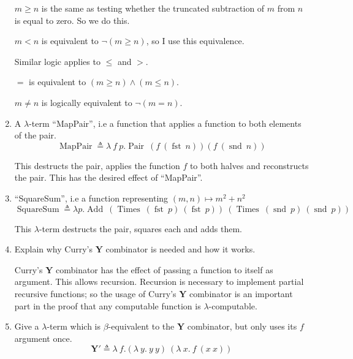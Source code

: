\documentclass[10pt,\jkfside,a4paper]{article}
\begin{document}
\begin{enumerate}[label=(\alph*)]
$m \geq n$ is the same as testing whether the truncated subtraction of $m$
from $n$ is equal to zero. So we do this.

$m < n$ is equivalent to $\neg(m \geq n)$, so I use this equivalence.

Similar logic applies to $\leq$ and $>$.

$=$ is equivalent to $(m \geq n) \wedge (m \leq n)$.

$m \neq n$ is logically equivalent to $\neg (m = n)$.

\item A $\lambda$-term ``MapPair'', i.e a function that applies a function
to both elements of the pair.
\[
\mathop{MapPair} \triangleq \lambda\ f\ p. \mathop{Pair}\ (f\ (\mathop{fst}\ n))
(f\ (\mathop{snd}\ n))
\]

This destructs the pair, applies the function $f$ to both halves and
reconstructs the pair. This has the desired effect of ``MapPair''.

\item ``SquareSum'', i.e a function representing $(m, n) \mapsto m^2 + n^2$
\[
\mathop{SquareSum} \triangleq \lambda p. \mathop{Add}\ (\mathop{Times}\
(\mathop{fst}\ p)\ (\mathop{fst}\ p))\ (\mathop{Times}\ (\mathop{snd}\ p)\
(\mathop{snd}\ p))
\]

This $\lambda$-term destructs the pair, squares each and adds them.

\item Explain why Curry's $\mathbf{Y}$ combinator is needed and how it works.

Curry's $\mathbf{Y}$ combinator has the effect of passing a function to
itself as argument. This allows recursion. Recursion is necessary to
implement partial recursive functions; so the usage of Curry's $\mathbf{Y}$
combinator is an important part in the proof that any
computable function is $\lambda$-computable.

\item Give a $\lambda$-term which is $\beta$-equivalent to the $\mathbf{Y}$
combinator, but only uses its $f$ argument once.
\[
\mathbf{Y}' \triangleq \lambda\ f. (\lambda\ y.\ y\ y)\ (\lambda\ x.\ f\ (x\ x))
\]

\end{enumerate}
\end{document}

